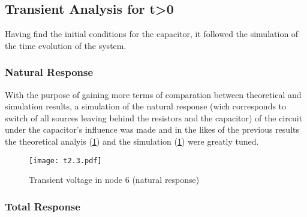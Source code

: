 \begin{table}[h]
  \centering
 \caption{Simulation results. A variable preceded by @ is of type {\em current}
   and expressed in Ampere; other variables are of type {\it voltage} and expressed in
   Volt.}
  \label{tab:op2}
\end{table}






\subsection{Transient Analysis for t>0}

Having find the initial conditions for the capacitor, it followed the simulation of the time evolution of the system.

\subsubsection{Natural Response}

With the purpose of gaining more terms of comparation between theoretical and simulation results, a simulation of the natural response (wich corresponds to switch of all sources leaving behind the resistors and the capacitor) of the circuit under the capacitor's influence was made and in the likes of the previous results the theoretical analyis (\ref{fig:trans1}) and the simulation (\ref{fig:trans1}) were greatly tuned.

\begin{figure}[h] \centering
\texttt{[image: t2.3.pdf]}
\caption{Transient voltage in node 6 (natural response)}
\label{fig:trans1}
\end{figure}

\subsubsection{Total Response}

